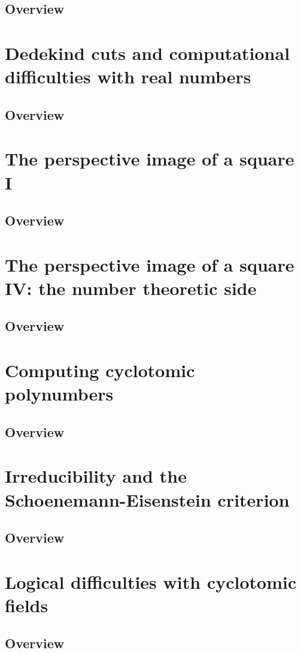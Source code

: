 \documentclass{article}
\begin{document}
\subsection{Overview}%
\label{sub:Overview}
\section{Dedekind cuts and computational difficulties with real numbers}
\subsection{Overview}%
\label{sub:Overview}
\section{The perspective image of a square I}
\subsection{Overview}%
\label{sub:Overview}
\section{The perspective image of a square IV: the number theoretic side}
\subsection{Overview}%
\label{sub:Overview}
\section{Computing cyclotomic polynumbers}
\subsection{Overview}%
\label{sub:Overview}
\section{Irreducibility and the Schoenemann-Eisenstein criterion}
\subsection{Overview}%
\label{sub:Overview}
\section{Logical difficulties with cyclotomic fields}
\subsection{Overview}%
\label{sub:Overview}
\end{document}
